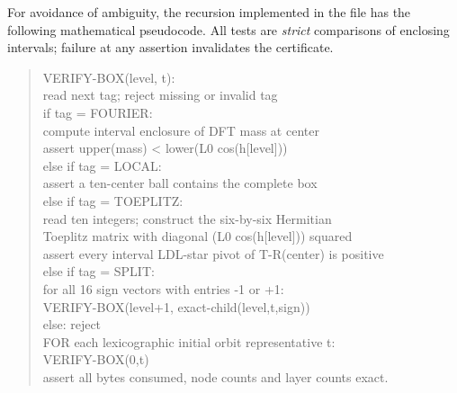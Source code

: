 \documentclass[11pt]{article}
\begin{document}
For avoidance of ambiguity, the recursion implemented in the file has the following mathematical pseudocode. All tests are \emph{strict} comparisons of enclosing intervals; failure at any assertion invalidates the certificate.
\begin{quote}\small\ttfamily
VERIFY-BOX(level, t):\\
\hspace*{1em}read next tag; reject missing or invalid tag\\
\hspace*{1em}if tag = FOURIER:\\
\hspace*{2em}compute interval enclosure of DFT mass at center\\
\hspace*{2em}assert upper(mass) < lower(L0 cos(h[level]))\\
\hspace*{1em}else if tag = LOCAL:\\
\hspace*{2em}assert a ten-center ball contains the complete box\\
\hspace*{1em}else if tag = TOEPLITZ:\\
\hspace*{2em}read ten integers; construct the six-by-six Hermitian\\
\hspace*{2em}Toeplitz matrix with diagonal (L0 cos(h[level])) squared\\
\hspace*{2em}assert every interval LDL-star pivot of T-R(center) is positive\\
\hspace*{1em}else if tag = SPLIT:\\
\hspace*{2em}for all 16 sign vectors with entries -1 or +1:\\
\hspace*{3em}VERIFY-BOX(level+1, exact-child(level,t,sign))\\
\hspace*{1em}else: reject\\[2pt]
FOR each lexicographic initial orbit representative t:\\
\hspace*{1em}VERIFY-BOX(0,t)\\
assert all bytes consumed, node counts and layer counts exact.
\end{quote}
\end{document}
